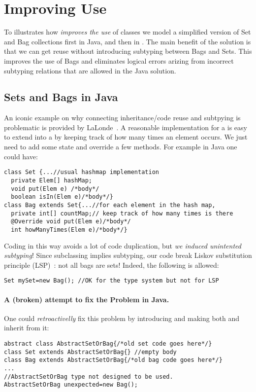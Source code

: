 \section{Improving Use}

To illustrates how 
\name \emph{improves the use} of classes we model a simplified version of
Set and Bag collections first in Java, and then in \name.
The main benefit of the \name solution is that we can get reuse 
without introducing subtyping between Bags and Sets. This improves the 
use of Bags and eliminates logical errors arizing from incorrect
subtyping relations that are allowed in the Java solution. 

\subsection{Sets and Bags in Java}
An iconic example on why connecting inheritance/code reuse and
subtpying is problematic is provided by
LaLonde~\cite{LaLonde:1991:SSS:110673.110679}.  A reasonable
implementation for a \Q@Set@ is easy to extend into a \Q@Bag@ by
keeping track of how many times an element occurs.  We just need to
add some state and override a few methods.
For example in Java one could have:

\begin{lstlisting}
class Set {...//usual hashmap implementation
  private Elem[] hashMap;
  void put(Elem e) /*body*/
  boolean isIn(Elem e)/*body*/}
class Bag extends Set{...//for each element in the hash map,
  private int[] countMap;// keep track of how many times is there
  @Override void put(Elem e)/*body*/
  int howManyTimes(Elem e)/*body*/}
\end{lstlisting}

\noindent Coding \Q@Bag@ in this way avoids a lot of code
duplication, but \emph{we induced unintented subtyping}! 
Since subclassing implies subtyping, our code break Liskov substitution principle (LSP)~\cite{martin2000design}: not all bags are sets!
Indeed, the following is allowed:

\begin{lstlisting}
Set mySet=new Bag(); //OK for the type system but not for LSP
\end{lstlisting}


\paragraph{A (broken) attempt to fix the Problem in Java.}
One could \emph{retroactivelly} fix this problem by introducing \Q@AbstractSetOrBag@
and making both \Q@Bag@ and \Q@Set@ inherit from it:
\begin{lstlisting}
abstract class AbstractSetOrBag{/*old set code goes here*/}
class Set extends AbstractSetOrBag{} //empty body
class Bag extends AbstractSetOrBag{/*old bag code goes here*/}
...
//AbstractSetOrBag type not designed to be used.
AbstractSetOrBag unexpected=new Bag(); 
\end{lstlisting}

